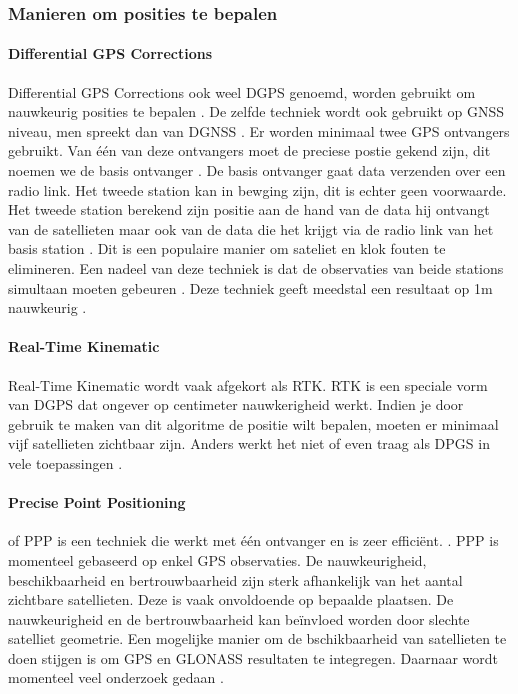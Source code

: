 \subsubsection{Manieren om posities te bepalen}
\paragraph{Differential GPS Corrections}
Differential GPS Corrections ook weel DGPS genoemd, worden gebruikt om nauwkeurig posities  te bepalen \cite{LBibGLONASS2}. De zelfde techniek wordt ook gebruikt op GNSS niveau, men spreekt dan van DGNSS \cite{LBibGNSS8}. Er worden minimaal twee GPS ontvangers gebruikt. Van \'e\'en van deze ontvangers moet de preciese postie gekend zijn, dit noemen we de basis ontvanger \cite{LBibGNSS2,LBibRTK}. De basis ontvanger gaat data verzenden over een radio link.  Het tweede station kan in bewging zijn, dit is echter geen voorwaarde. Het tweede station berekend zijn positie aan de hand van de data hij ontvangt van de satellieten maar ook van de data die het krijgt via de radio link van het basis station \cite{LBibRTK}. Dit is een populaire manier om sateliet en klok fouten te elimineren. Een nadeel van deze techniek is dat de observaties van beide stations simultaan moeten gebeuren \cite{LBibGNSS2}. Deze techniek geeft meedstal een resultaat op 1m nauwkeurig \cite{LBibRTK}.

\paragraph{Real-Time Kinematic}
Real-Time Kinematic wordt vaak afgekort als RTK. RTK is een speciale vorm van DGPS dat ongever op centimeter nauwkerigheid werkt. Indien je door gebruik te maken van dit algoritme de positie wilt bepalen, moeten er minimaal vijf satellieten zichtbaar zijn. Anders werkt het niet of even traag als DPGS in vele toepassingen \cite{LBibRTK}. 

\paragraph{Precise Point Positioning}
of PPP is een techniek die werkt met \'e\'en ontvanger en is zeer effici\"ent. \cite{LBibGNSS4}. PPP is momenteel gebaseerd op enkel GPS observaties. De nauwkeurigheid, beschikbaarheid en bertrouwbaarheid zijn sterk afhankelijk van het aantal zichtbare satellieten. Deze is vaak onvoldoende op bepaalde plaatsen. De nauwkeurigheid en de bertrouwbaarheid kan be\"invloed worden door slechte satelliet geometrie. Een mogelijke manier om de bschikbaarheid van satellieten te doen stijgen is om GPS en GLONASS resultaten te integregen. Daarnaar wordt momenteel veel onderzoek gedaan \cite{LBibPPP}. 

